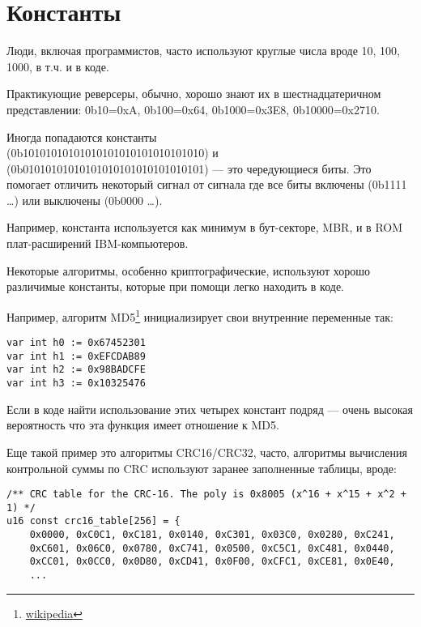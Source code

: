 \section{Константы}

Люди, включая программистов, часто используют круглые числа вроде 10, 100, 1000, в т.ч. и в коде.

Практикующие реверсеры, обычно, хорошо знают их в шестнадцатеричном представлении:
0b10=0xA, 0b100=0x64, 0b1000=0x3E8, 0b10000=0x2710.

Иногда попадаются константы  \\
(0b10101010101010101010101010101010) и
 (0b01010101010101010101010101010101) --- это чередующиеся биты.
Это помогает отличить некоторый сигнал от сигнала где все биты включены (0b1111 \dots) или выключены (0b0000 \dots).

Например, константа  используется как минимум в бут-секторе, \ac{MBR}, 
и в \ac{ROM} плат-расширений IBM-компьютеров.

Некоторые алгоритмы, особенно криптографические, используют хорошо различимые константы, 
которые при помощи \IDA легко находить в коде.

\newcommand{\URLMD}{http://go.yurichev.com/17110}

Например, алгоритм MD5\footnote{\href{\URLMD}{wikipedia}} инициализирует свои внутренние переменные так:

\begin{verbatim}
var int h0 := 0x67452301
var int h1 := 0xEFCDAB89
var int h2 := 0x98BADCFE
var int h3 := 0x10325476
\end{verbatim}

Если в коде найти использование этих четырех констант подряд --- очень высокая вероятность что эта функция имеет отношение к MD5.

\par
Еще такой пример это алгоритмы CRC16/CRC32, часто, алгоритмы вычисления контрольной суммы по CRC 
используют заранее заполненные таблицы, вроде:

\begin{lstlisting}[caption=linux/lib/crc16.c,style=customc]
/** CRC table for the CRC-16. The poly is 0x8005 (x^16 + x^15 + x^2 + 1) */
u16 const crc16_table[256] = {
	0x0000, 0xC0C1, 0xC181, 0x0140, 0xC301, 0x03C0, 0x0280, 0xC241,
	0xC601, 0x06C0, 0x0780, 0xC741, 0x0500, 0xC5C1, 0xC481, 0x0440,
	0xCC01, 0x0CC0, 0x0D80, 0xCD41, 0x0F00, 0xCFC1, 0xCE81, 0x0E40,
	...
\end{lstlisting}

